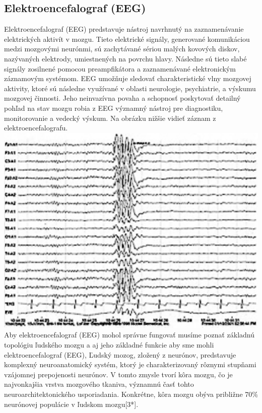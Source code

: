 \subsection{Elektroencefalograf (EEG)}
\tab[5 mm] Elektroencefalograf (EEG) predstavuje nástroj navrhnutý na zaznamenávanie elektrických aktivít v mozgu. Tieto elektrické signály, generované komunikáciou medzi mozgovými neurónmi, sú zachytávané sériou malých kovových diskov, nazývaných elektrody, umiestnených na povrchu hlavy. Následne sú tieto slabé signály zosilnené pomocou preampfikátora a zaznamenávané elektronickým záznamovým systémom. EEG umožňuje sledovať charakteristické vlny mozgovej aktivity, ktoré sú následne využívané v oblasti neurologie, psychiatrie, a výskumu mozgovej činnosti. Jeho neinvazívna povaha a schopnosť poskytovať detailný pohľad na stav mozgu robia z EEG významný nástroj pre diagnostiku, monitorovanie a vedecký výskum. Na obrázku nižšie vidieť záznam z elektroencefalografu.\\
\includegraphics[width=1.0\textwidth]{images/eeg.jpg}\\
\tab[5 mm] Aby elektroencefalograf (EEG) mohol správne fungovať musíme poznať základnú topológiu ľudského mozgu a aj jeho základné funkcie aby sme mohli elektroencefalograf (EEG), Ľudský mozog, zložený z neurónov, predstavuje komplexný neuroanatomický systém, ktorý je charakterizovaný rôznymi stupňami vzájomnej prepojenosti neurónov. V tomto zmysle tvorí kôra mozgu, čo je najvonkajšia vrstva mozgového tkaniva, významnú časť tohto neuroarchitektonického usporiadania. Konkrétne, kôra mozgu obýva približne 70\% neurónovej populácie v ľudskom mozgu[3*]. \\
